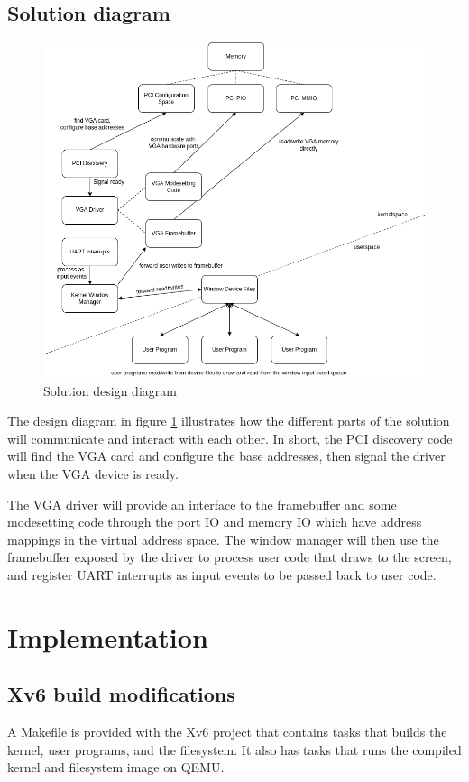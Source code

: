 \subsection{Solution diagram}
\begin{figure}[H]
    \centering
    \includegraphics[width=16cm]{diagram.drawio.png}
    \caption{Solution design diagram}
    \label{figure:3}
\end{figure}

The design diagram in figure \ref{figure:3} illustrates how the different parts
of the solution will communicate and interact with each other. In short, the PCI
discovery code will find the VGA card and configure the base addresses, then signal
the driver when the VGA device is ready. 

The VGA driver will provide an interface to the framebuffer and some modesetting code 
through the port IO and memory IO which
have address mappings in the virtual address space. The window manager will then use
the framebuffer exposed by the driver to process user code that draws to the screen,
and register UART interrupts as input events to be passed back to user code.

\section{Implementation}

\subsection{Xv6 build modifications}
A Makefile is provided with the Xv6 project that contains tasks that builds the
kernel, user programs, and the filesystem. It also has tasks that runs the compiled
kernel and filesystem image on QEMU.

